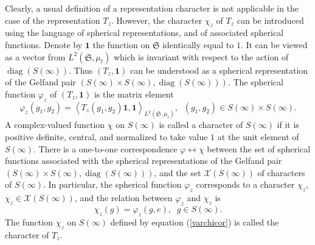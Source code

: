 \documentclass[12pt]{amsart}
\theoremstyle{definition}
\numberwithin{equation}{section}
\DeclareMathOperator{\diag}{diag}
\begin{document}
Clearly, a usual definition of a representation character is not applicable in the case of
the representation $T_{z}$. However, the character $\chi_z$ of $T_z$ can be introduced
using the language of spherical representations, and of associated spherical functions.
Denote by $\mathbf{1}$ the function on $\mathfrak{S}$ identically equal to $1$. It can be viewed as a vector from $L^2\left(\mathfrak{S},\mu_t\right)$ which is invariant with respect to the action of $\diag\left(S\left(\infty\right)\right)$. Thus $\left(T_z,\mathbf{1}\right)$ can be understood as a spherical representation of the Gelfand pair $\left(S(\infty)\times S(\infty),\diag\left(S(\infty)\right)\right)$.  The spherical function $\varphi_z$ of $\left(T_z,\mathbf{1}\right)$
is the matrix element
\begin{equation}
\varphi_z\left(g_1,g_2\right)=\left<T_z\left(g_1,g_2\right)\mathbf{1},\mathbf{1}\right>_{L^2\left(\mathfrak{S},\mu_t\right)},\;\;\left(g_1,g_2\right)\in S(\infty)\times S(\infty).
\nonumber
\end{equation}
A complex-valued function $\chi$ on $S(\infty)$ is called a character of $S(\infty)$ if it is positive definite, central, and normalized to take value $1$
at the unit element of $S(\infty)$.
There is a one-to-one correspondence $\varphi\longleftrightarrow\chi$ between the set
 of spherical functions associated with the spherical representations of the Gelfand pair
$\left(S(\infty)\times S(\infty),\diag\left(S(\infty)\right)\right)$,
and the set
$\mathcal{X}\left(S(\infty)\right)$ of characters of $S(\infty)$. In particular, the spherical function $\varphi_z$ corresponds to a character $\chi_z$,  $\chi_z\in\mathcal{X}\left(S(\infty)\right)$, and
the relation between $\varphi_z$ and $\chi_z$ is
\begin{equation}\label{varchicor}
\chi_z\left(g\right)=\varphi_z\left(g,e\right),\;\;g\in S(\infty).
\end{equation}
The function $\chi_z$ on $S(\infty)$ defined by equation (\ref{varchicor}) is called the character of $T_z$.
\end{document}
